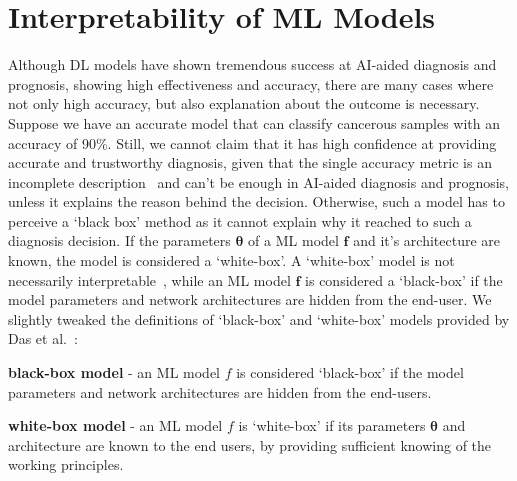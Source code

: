 \section{Interpretability of ML Models}
\label{sec:xai_methods}
Although DL models have shown tremendous success at AI-aided diagnosis and prognosis, showing high effectiveness and accuracy, there are many cases where not only high accuracy, but also explanation about the outcome is necessary. Suppose we have an accurate model that can classify cancerous samples with an accuracy of 90\%. Still, we cannot claim that it has high confidence at providing accurate and trustworthy diagnosis, given that the single accuracy metric is an incomplete description~\cite{doshi2017towards} and can't be enough in AI-aided diagnosis and prognosis, unless it explains the reason behind the  decision. Otherwise, such a model has to perceive a `black box' method as it cannot explain why it reached to such a diagnosis decision. %
If the parameters $\boldsymbol{\theta}$ of a ML model $\boldsymbol{f}$ and it's architecture are known, the model is considered a `white-box'. %
A `white-box' model is not necessarily interpretable~\cite{das2020opportunities}, while an ML model $\boldsymbol{f}$ is considered a `black-box' if the model parameters and network architectures are hidden from the end-user. We slightly tweaked the definitions of `black-box' and `white-box' models provided by Das et al.~\cite{das2020opportunities}: 

\begin{definition}
    \textbf{black-box model} - an ML model $f$ is considered `black-box' if the model parameters and network architectures are hidden from the end-users. 
\end{definition}

\begin{definition}
    \textbf{white-box model} - an ML model $f$ is `white-box' if its parameters $\boldsymbol{\theta}$ and architecture are known to the end users, by providing sufficient knowing of the working principles. %
\end{definition}

